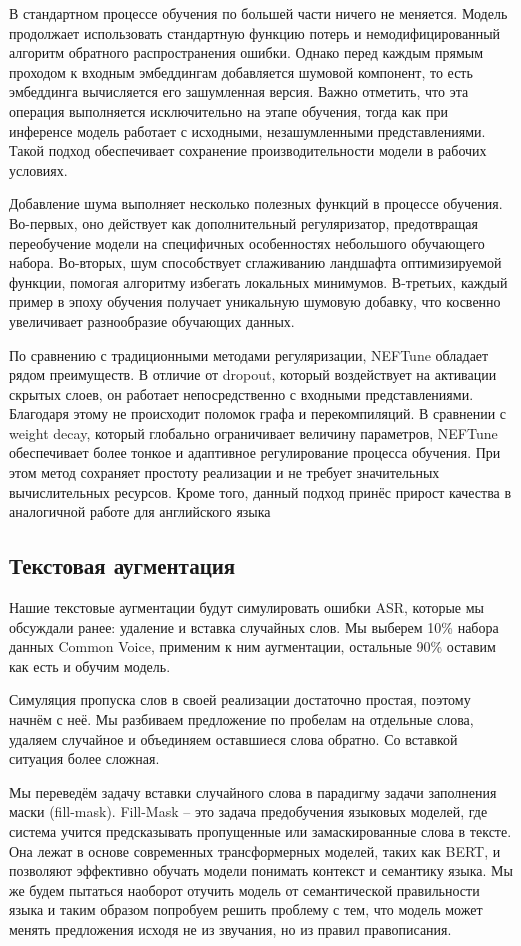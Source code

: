 В стандартном процессе обучения по большей части ничего не меняется.
Модель продолжает использовать стандартную функцию потерь и немодифицированный алгоритм обратного распространения ошибки.
Однако перед каждым прямым проходом к входным эмбеддингам добавляется шумовой компонент, то есть эмбеддинга вычисляется его зашумленная версия.
Важно отметить, что эта операция выполняется исключительно на этапе обучения, тогда как при инференсе модель работает с исходными, незашумленными представлениями.
Такой подход обеспечивает сохранение производительности модели в рабочих условиях.

Добавление шума выполняет несколько полезных функций в процессе обучения.
Во-первых, оно действует как дополнительный регуляризатор, предотвращая переобучение модели на специфичных особенностях небольшого обучающего набора.
Во-вторых, шум способствует сглаживанию ландшафта оптимизируемой функции, помогая алгоритму избегать локальных минимумов.
В-третьих, каждый пример в эпоху обучения получает уникальную шумовую добавку, что косвенно увеличивает разнообразие обучающих данных.

По сравнению с традиционными методами регуляризации, NEFTune обладает рядом преимуществ.
В отличие от dropout, который воздействует на активации скрытых слоев, он работает непосредственно с входными представлениями.
Благодаря этому не происходит поломок графа  и перекомпиляций.
В сравнении с weight decay, который глобально ограничивает величину параметров, NEFTune обеспечивает более тонкое и адаптивное регулирование процесса обучения.
При этом метод сохраняет простоту реализации и не требует значительных вычислительных ресурсов.
Кроме того, данный подход принёс прирост качества в аналогичной работе для английского языка

\subsection{Текстовая аугментация}
Нашие текстовые аугментации будут симулировать ошибки ASR, которые мы обсуждали ранее: удаление и вставка случайных слов.
Мы выберем 10\% набора данных Common Voice, применим к ним аугментации, остальные 90\% оставим как есть и обучим модель.

Симуляция пропуска слов в своей реализации достаточно простая, поэтому начнём с неё.
Мы разбиваем предложение по пробелам на отдельные слова, удаляем случайное и объединяем оставшиеся слова обратно.
Со вставкой ситуация более сложная.

Мы переведём задачу вставки случайного слова в парадигму задачи заполнения маски (fill-mask).
Fill-Mask -- это задача предобучения языковых моделей, где система учится предсказывать пропущенные или замаскированные слова в тексте.
Она лежат в основе современных трансформерных моделей, таких как BERT\cite{devlin2019bert}, и позволяют эффективно обучать модели понимать контекст и семантику языка.
Мы же будем пытаться наоборот отучить модель от семантической правильности языка и таким образом попробуем решить проблему с тем, что модель может менять предложения исходя не из звучания, но из правил правописания.

